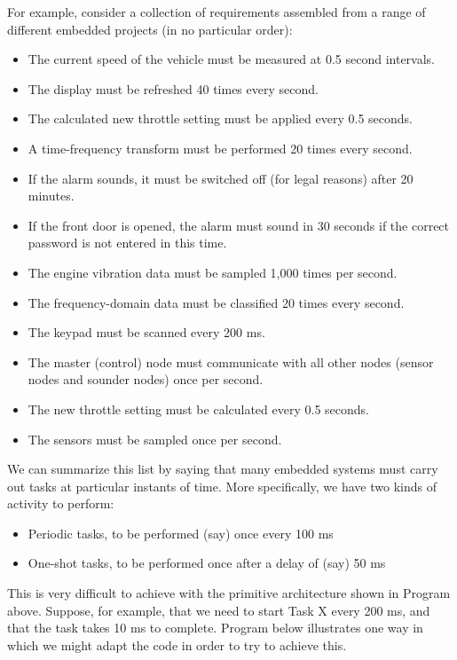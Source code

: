 For example, consider a collection of requirements assembled from a range of different embedded projects (in no particular order):
\begin{itemize}
    \item The current speed of the vehicle must be measured at 0.5 second intervals.
    \item The display must be refreshed 40 times every second. 
    \item The calculated new throttle setting must be applied every 0.5 seconds.
    \item A time-frequency transform must be performed 20 times every second.
    \item If the alarm sounds, it must be switched off (for legal reasons) after 20 minutes.
    \item If the front door is opened, the alarm must sound in 30 seconds if the correct
password is not entered in this time.    
\item The engine vibration data must be sampled 1,000 times per second.
    \item The frequency-domain data must be classified 20 times every second.
    \item The keypad must be scanned every 200 ms.
    \item The master (control) node must communicate with all other nodes (sensor nodes
and sounder nodes) once per second.
    \item The new throttle setting must be calculated every 0.5 seconds. 
    \item The sensors must be sampled once per second.
\end{itemize}

We can summarize this list by saying that many embedded systems must carry
out tasks at particular instants of time. More specifically, we have two kinds of activity to perform:
\begin{itemize}
    \item Periodic tasks, to be performed (say) once every 100 ms
    \item One-shot tasks, to be performed once after a delay of (say) 50 ms  
\end{itemize}

This is very difficult to achieve with the primitive architecture shown in Program above. Suppose, for example, that we need to start Task X every 200 ms, and that the
task takes 10 ms to complete. Program below illustrates one way in which we might
adapt the code in order to try to achieve this.

